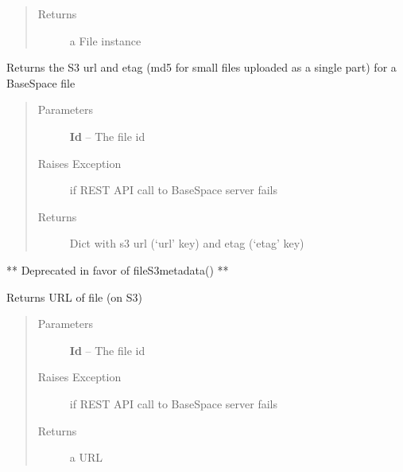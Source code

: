 \documentclass[letterpaper,10pt,english]{sphinxmanual}
\begin{document}
\begin{fulllineitems}
\begin{fulllineitems}
\begin{quote}
\begin{description}
\item[{Returns}] \leavevmode
a File instance

\end{description}\end{quote}

\end{fulllineitems}


\begin{fulllineitems}
\label{Available modules:BaseSpacePy.api.BaseSpaceAPI.BaseSpaceAPI.fileS3metadata}
Returns the S3 url and etag (md5 for small files uploaded as a single part) for a BaseSpace file
\begin{quote}\begin{description}
\item[{Parameters}] \leavevmode
\textbf{Id} -- The file id

\item[{Raises Exception}] \leavevmode
if REST API call to BaseSpace server fails

\item[{Returns}] \leavevmode
Dict with s3 url (`url' key) and etag (`etag' key)

\end{description}\end{quote}

\end{fulllineitems}


\begin{fulllineitems}
\label{Available modules:BaseSpacePy.api.BaseSpaceAPI.BaseSpaceAPI.fileUrl}
** Deprecated in favor of fileS3metadata() **

Returns URL of file (on S3)
\begin{quote}\begin{description}
\item[{Parameters}] \leavevmode
\textbf{Id} -- The file id

\item[{Raises Exception}] \leavevmode
if REST API call to BaseSpace server fails

\item[{Returns}] \leavevmode
a URL

\end{description}\end{quote}


\end{fulllineitems}
\end{fulllineitems}
\end{document}
